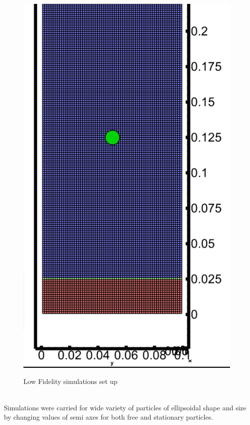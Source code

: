 \begin{figure}[h!]
\centering \includegraphics[scale=0.3]{fig/lofi-domain.png}\\
\caption{Low Fidelity simulations set up \label{fig:lofi-domain}}
\end{figure}\\
Simulations were carried for wide variety of particles of ellipsoidal shape and size by changing values of semi axes for both free and stationary particles.

